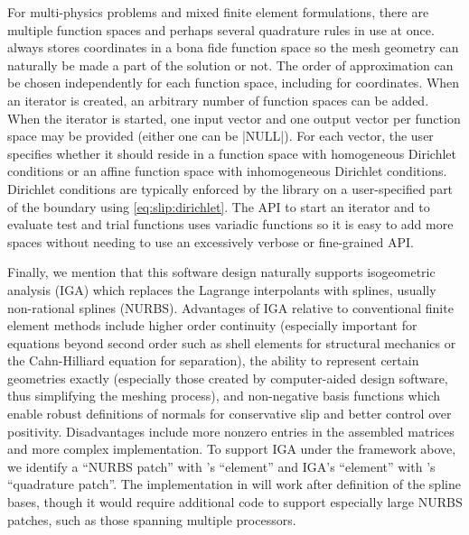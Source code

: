 For multi-physics problems and mixed finite element formulations, there are multiple function spaces and perhaps several quadrature rules in use at once.
{\Dohp} always stores coordinates in a bona fide function space so the mesh geometry can naturally be made a part of the solution or not.
The order of approximation can be chosen independently for each function space, including for coordinates.
When an iterator is created, an arbitrary number of function spaces can be added.
When the iterator is started, one input vector and one output vector per function space may be provided (either one can be \cverb|NULL|).
For each vector, the user specifies whether it should reside in a function space with homogeneous Dirichlet conditions or an affine function space with inhomogeneous Dirichlet conditions.
Dirichlet conditions are typically enforced by the library on a user-specified part of the boundary using \eqref{eq:slip:dirichlet}.
The API to start an iterator and to evaluate test and trial functions uses variadic functions so it is easy to add more spaces without needing to use an excessively verbose or fine-grained API.

Finally, we mention that this software design naturally supports isogeometric analysis (IGA) \citep{cottrell2009isogeometric} which replaces the Lagrange interpolants with splines, usually non-rational splines (NURBS).
Advantages of IGA relative to conventional finite element methods include higher order continuity (especially important for equations beyond second order such as shell elements for structural mechanics or the Cahn-Hilliard equation for separation), the ability to represent certain geometries exactly (especially those created by computer-aided design software, thus simplifying the meshing process), and non-negative basis functions which enable robust definitions of normals for conservative slip and better control over positivity.
Disadvantages include more nonzero entries in the assembled matrices and more complex implementation.
To support IGA under the framework above, we identify a ``NURBS patch'' with \Dohp's ``element'' and IGA's ``element'' with \Dohp's ``quadrature patch''.
The implementation in {\Dohp} will work after definition of the spline bases, though it would require additional code to support especially large NURBS patches, such as those spanning multiple processors.

